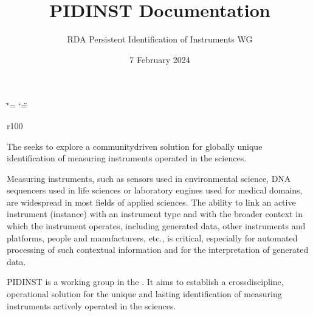 \documentclass[a4paper,10pt,english]{sphinxmanual}
\title{PIDINST Documentation}
\date{7 February 2024}
\author{RDA Persistent Identification of Instruments WG}
\let\sphinxpxdimen\pdfpxdimen\else\newdimen\sphinxpxdimen
\begin{document}
\ifdefined\shorthandoff
  \ifnum\catcode`\=\string=\active\shorthandoff{=}\fi
  \ifnum\catcode`\"=\active{}\fi
\fi

\pagestyle{empty}
\sphinxmaketitle

\pagestyle{plain}
\label{\detokenize{index::doc}}
\begin{wrapfigure}{r}{100\sphinxpxdimen}
  \sphinxincludegraphics[width=100\sphinxpxdimen]{{pidinst-logo}.pdf}
\end{wrapfigure}
\sphinxAtStartPar
The  seeks to explore a community\sphinxhyphen{}driven solution for globally
unique identification of measuring instruments operated in the
sciences.

\sphinxAtStartPar
Measuring instruments, such as sensors used in environmental science,
DNA sequencers used in life sciences or laboratory engines used for
medical domains, are widespread in most fields of applied sciences.
The ability to link an active instrument (instance) with an instrument
type and with the broader context in which the instrument operates,
including generated data, other instruments and platforms, people and
manufacturers, etc., is critical, especially for automated processing
of such contextual information and for the interpretation of generated
data.

\sphinxAtStartPar
PIDINST is a working group in the .  It aims to establish a cross\sphinxhyphen{}discipline, operational
solution for the unique and lasting identification of measuring
instruments actively operated in the sciences.
\end{document}
